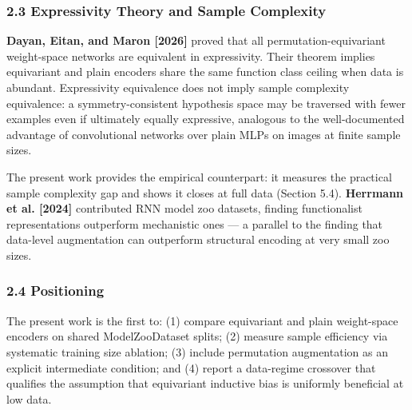 \subsubsection{2.3 Expressivity Theory and Sample Complexity}

\textbf{Dayan, Eitan, and Maron [2026]} proved that all permutation-equivariant weight-space networks are equivalent in expressivity. Their theorem implies equivariant and plain encoders share the same function class ceiling when data is abundant. Expressivity equivalence does not imply sample complexity equivalence: a symmetry-consistent hypothesis space may be traversed with fewer examples even if ultimately equally expressive, analogous to the well-documented advantage of convolutional networks over plain MLPs on images at finite sample sizes.

The present work provides the empirical counterpart: it measures the practical sample complexity gap and shows it closes at full data (Section 5.4). \textbf{Herrmann et al. [2024]} contributed RNN model zoo datasets, finding functionalist representations outperform mechanistic ones --- a parallel to the finding that data-level augmentation can outperform structural encoding at very small zoo sizes.

\subsubsection{2.4 Positioning}

The present work is the first to: (1) compare equivariant and plain weight-space encoders on shared ModelZooDataset splits; (2) measure sample efficiency via systematic training size ablation; (3) include permutation augmentation as an explicit intermediate condition; and (4) report a data-regime crossover that qualifies the assumption that equivariant inductive bias is uniformly beneficial at low data.


